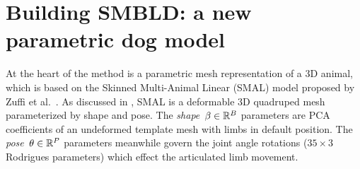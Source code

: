 \def\smalrestT{\bar{T}}
\def\smalrestJ{J}
\def\smalbweightsW{\mathcal{W}}

\def\smalrestv#1#2{\bar{#1_{#2}}}
\def\smalbweightw{w}

\def\poseele#1{\omega_{#1}}
\def\poseelenorm#1{\bar{\omega_{#1}}}

\newcommand{\bigzero}{\mbox{\normalfont\Large\bfseries 0}}
\newcommand{\bigone}{\mbox{\normalfont\Large\bfseries 1}}
\newcommand{\rvline}{\hspace*{-\arraycolsep}\vline\hspace*{-\arraycolsep}}


\section{Building SMBLD: a new parametric dog model}


At the heart of the method is a parametric mesh representation of a 3D animal, which is based on the Skinned Multi-Animal Linear (SMAL) model proposed by Zuffi et al.~\cite{zuffi2017menagerie}. As discussed in , SMAL is a deformable 3D quadruped mesh parameterized by shape and pose. The \emph{shape}~$\beta \in {\mathbb{R}^{B}}$ parameters are PCA coefficients of an undeformed template mesh with limbs in default position. The \emph{pose}~$\theta \in {\mathbb{R}^{P}}$ parameters meanwhile govern the joint angle rotations ($35 \times 3$ Rodrigues parameters) which effect the articulated limb movement. 



